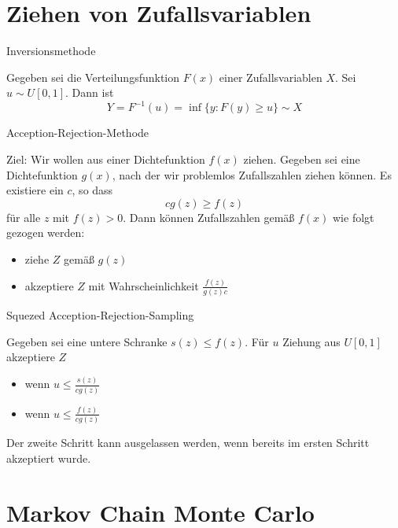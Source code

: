 \documentclass[ignorenonframetext,]{beamer}
\begin{document}
\section{Ziehen von Zufallsvariablen}\label{ziehen-von-zufallsvariablen}

\begin{frame}{Inversionsmethode}

Gegeben sei die Verteilungsfunktion \(F(x)\) einer Zufallsvariablen
\(X\). Sei \(u\sim U[0,1]\). Dann ist \[
Y = F^{-1}(u) = \inf\{y:F(y)\geq u\} \sim X
\]

\end{frame}

\begin{frame}{Acception-Rejection-Methode}

Ziel: Wir wollen aus einer Dichtefunktion \(f(x)\) ziehen. Gegeben sei
eine Dichtefunktion \(g(x)\), nach der wir problemlos Zufallszahlen
ziehen können. Es existiere ein \(c\), so dass \[
cg(z)\geq f(z)
\] für alle \(z\) mit \(f(z)>0\). Dann können Zufallszahlen gemäß
\(f(x)\) wie folgt gezogen werden:

\begin{itemize}
\item ziehe $Z$ gemäß $g(z)$
\item akzeptiere $Z$ mit Wahrscheinlichkeit $\frac{f(z)}{g(z)c}$ 
\end{itemize}


\end{frame}

\begin{frame}{Squezed Acception-Rejection-Sampling}

Gegeben sei eine untere Schranke \(s(z) \leq f(z)\). Für \(u\) Ziehung
aus \(U[0,1]\) akzeptiere \(Z\)

\begin{itemize}
\item wenn $u\leq \frac{s(z)}{cg(z)}$
\item wenn $u\leq \frac{f(z)}{cg(z)}$
\end{itemize}

Der zweite Schritt kann ausgelassen werden, wenn bereits im ersten
Schritt akzeptiert wurde.

\end{frame}

\section{Markov Chain Monte Carlo}\label{markov-chain-monte-carlo}
\end{document}
